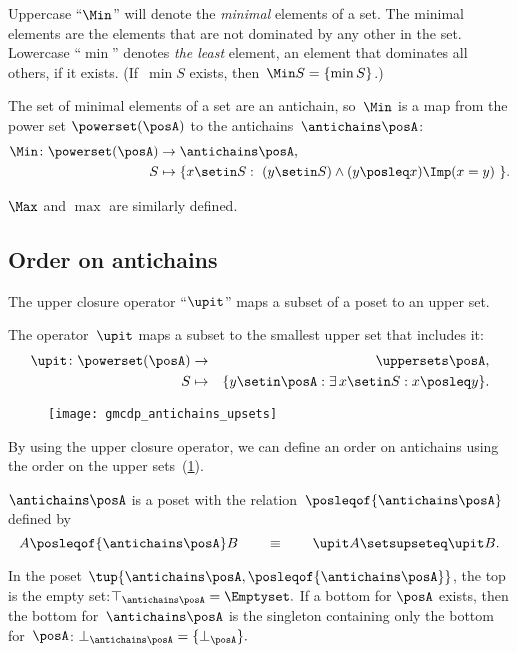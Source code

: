 
Uppercase ``$\Min$'' will denote the \emph{minimal} elements of a set.
The minimal elements are the elements that are not dominated by any other in the set.
Lowercase ``$\min$'' denotes\emph{ the least} element, an element that dominates all others, if it exists.
(If~$\min S$ exists, then~$\Min S=\{\min S\}$.)

The set of minimal elements of a set are an antichain, so~$\Min$
is a map from the power set $\powerset(\posA)$ to the antichains~$\antichains\posA$:
\begin{align*}
    \Min\colon\powerset(\posA) & \rightarrow\antichains\posA, \\
    S                          & \mapsto\{x\setin S:\ (y\setin S)\wedge(y\posleq x)\Imp(x=y)\ \}.
\end{align*}

$\Max$ and $\max$ are similarly defined.

\subsection{Order on antichains}

The upper closure operator ``$\upit$'' maps a subset of a poset to an upper set.
\begin{definition}
    The operator~$\upit$ maps a subset to the smallest upper set that includes it:
    \begin{eqnarray*}
        \upit\colon\powerset(\posA) & \rightarrow & \uppersets\posA,\\
        S & \mapsto & \{y\setin\posA:\exists\,x\setin S:x\posleq y\}.
    \end{eqnarray*}
\end{definition}

\begin{figure}[h]
    \centering
    \texttt{[image: gmcdp\_antichains\_upsets]}
    \caption{}
    \label{fig:antichains_upsets}
\end{figure}

By using the upper closure operator, we can define an order on antichains using the order on the upper sets~(\cref{fig:antichains_upsets}).
\begin{lemma}
    \label{lem:antichains-are-poset}$\antichains\posA$ is a poset with the relation~$\posleqof{\antichains\posA}$ defined by
    \[
        A\posleqof{\antichains\posA}
        B\qquad\equiv\qquad\upit A\setsupseteq\upit B.
    \]
\end{lemma}
In the poset $\tup{\antichains\posA,\posleqof{\antichains\posA}}$, the top is the empty set:$\top_{\antichains\posA}=\Emptyset.
$
If a bottom for $\posA$ exists, then the bottom for~$\antichains\posA$
is the singleton containing only the bottom for~$\posA$: $\bot_{\antichains\posA}=\{\bot_{\posA}\}.$

